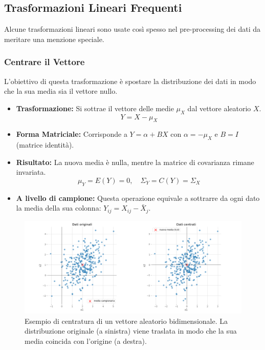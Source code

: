 \subsection{Trasformazioni Lineari Frequenti}
Alcune trasformazioni lineari sono usate così spesso nel pre-processing dei dati da meritare una menzione speciale.

\subsubsection{Centrare il Vettore}
L'obiettivo di questa trasformazione è spostare la distribuzione dei dati in modo che la sua media sia il vettore nullo.
\begin{itemize}
    \item \textbf{Trasformazione:} Si sottrae il vettore delle medie \(\mu_X\) dal vettore aleatorio \(X\).
    \[ Y = X - \mu_X \]
    \item \textbf{Forma Matriciale:} Corrisponde a \(Y = \alpha + BX\) con \(\alpha = -\mu_X\) e \(B=I\) (matrice identità).
    \item \textbf{Risultato:} La nuova media è nulla, mentre la matrice di covarianza rimane invariata.
    \[ \mu_Y = E(Y) = 0, \quad \Sigma_Y = C(Y) = \Sigma_X \]
    \item \textbf{A livello di campione:} Questa operazione equivale a sottrarre da ogni dato la media della sua colonna: \(Y_{ij} = X_{ij} - \bar{X}_j\).
\end{itemize}

\begin{figure}[H]
    \centering
    \includegraphics[width=\textwidth]{images/th_07_09/centering_transformation.png}
    \caption{Esempio di centratura di un vettore aleatorio bidimensionale. La distribuzione originale (a sinistra) viene traslata in modo che la sua media coincida con l'origine (a destra).}
    \label{fig:centering_transformation}
\end{figure}

